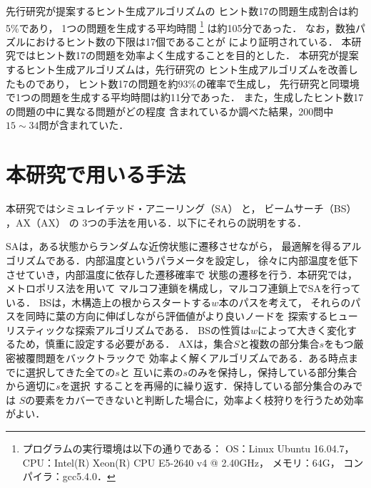 \documentclass[a4paper, 9pt]{jarticle}
\begin{document}
\begin{論文概要}
先行研究が提案するヒント生成アルゴリズムの
ヒント数17の問題生成割合は約5\%であり，
1つの問題を生成する平均時間
\footnote{プログラムの実行環境は以下の通りである： 
OS：Linux Ubuntu 16.04.7，
CPU：Intel(R) Xeon(R) CPU E5-2640 v4 @ 2.40GHz，
メモリ：64G，
コンパイラ：gcc5.4.0．
}
は約105分であった．
なお，数独パズルにおけるヒント数の下限は17個であることが 
\cite{seventeen_hints} により証明されている．
本研究ではヒント数17の問題を効率よく生成することを目的とした．
本研究が提案するヒント生成アルゴリズムは，先行研究の
ヒント生成アルゴリズムを改善したものであり，
ヒント数17の問題を約93\%の確率で生成し，
先行研究と同環境で1つの問題を生成する平均時間は約11分であった．
また，生成したヒント数17の問題の中に異なる問題がどの程度
含まれているか調べた結果，200問中$15 \sim 34$問が含まれていた．

\section{本研究で用いる手法}
本研究ではシミュレイテッド・アニーリング（SA） \cite{sa} と，
ビームサーチ（BS） \cite{beam_search}，AX（AX） \cite{AX} の
3つの手法を用いる．以下にそれらの説明をする．

SAは，ある状態からランダムな近傍状態に遷移させながら，
最適解を得るアルゴリズムである．内部温度というパラメータを設定し，
徐々に内部温度を低下させていき，内部温度に依存した遷移確率で
状態の遷移を行う．本研究では，メトロポリス法を用いて
マルコフ連鎖を構成し，マルコフ連鎖上でSAを行っている．
BSは，木構造上の根からスタートする$w$本のパスを考えて，
それらのパスを同時に葉の方向に伸ばしながら評価値がより良いノードを
探索するヒューリスティックな探索アルゴリズムである．
BSの性質は$w$によって大きく変化するため，慎重に設定する必要がある．
AXは，集合$S$と複数の部分集合$s$をもつ厳密被覆問題をバックトラックで
効率よく解くアルゴリズムである．ある時点までに選択してきた全ての$s$と
互いに素の$s$のみを保持し，保持している部分集合から適切に$s$を選択
することを再帰的に繰り返す．保持している部分集合のみでは
$S$の要素をカバーできないと判断した場合に，効率よく枝狩りを行うため効率がよい．


\end{論文概要}
\end{document}
